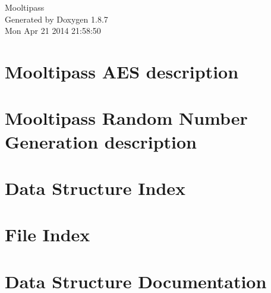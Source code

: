 \documentclass[twoside]{book}
\newcommand{\+}{\discretionary{\mbox{\scriptsize$\hookleftarrow$}}{}{}}
\newcommand{\clearemptydoublepage}{%
  \newpage{\pagestyle{empty}\cleardoublepage}%
}
\begin{document}
\hypersetup{pageanchor=false,
             bookmarks=true,
             bookmarksnumbered=true,
             pdfencoding=unicode
            }
\begin{titlepage}
\vspace*{7cm}
\begin{center}%
{\Large Mooltipass }\\
\vspace*{1cm}
{\large Generated by Doxygen 1.8.7}\\
\vspace*{0.5cm}
{\small Mon Apr 21 2014 21:58:50}\\
\end{center}
\end{titlepage}
\clearemptydoublepage
\tableofcontents
\clearemptydoublepage
{}
\hypersetup{pageanchor=true}

\chapter{Mooltipass A\+E\+S description}
\label{md__c_1__users_limpkin__dropbox__projets_mooltipass_source_code_src__a_e_s__r_e_a_d_m_e}
\hypertarget{md__c_1__users_limpkin__dropbox__projets_mooltipass_source_code_src__a_e_s__r_e_a_d_m_e}{}

\chapter{Mooltipass Random Number Generation description}
\label{md__c_1__users_limpkin__dropbox__projets_mooltipass_source_code_src__r_n_g__r_e_a_d_m_e}
\hypertarget{md__c_1__users_limpkin__dropbox__projets_mooltipass_source_code_src__r_n_g__r_e_a_d_m_e}{}

\chapter{Data Structure Index}

\chapter{File Index}

\chapter{Data Structure Documentation}











\end{document}
